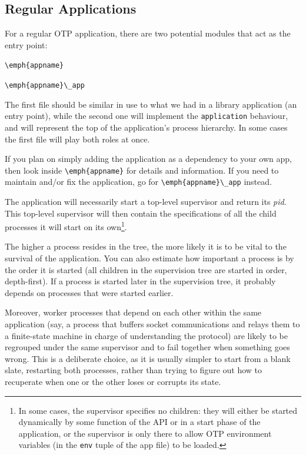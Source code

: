 \documentclass[11pt, oneside]{book}   	%
\newcommand{\module}[1]{\Verb`#1`}
\newcommand{\expression}[1]{\Verb`#1`}
\begin{document}
\subsection{Regular Applications}
\label{subsec:dive-regular-applications}

For a regular OTP application, there are two potential modules that act as the entry point:

\begin{enumerate*}
	\item \module{\emph{appname}}
	\item \module{\emph{appname}\_app}
\end{enumerate*}

The first file should be similar in use to what we had in a library application (an entry point), while the second one will implement the \module{application} behaviour, and will represent the top of the application's process hierarchy. In some cases the first file will play both roles at once.

If you plan on simply adding the application as a dependency to your own app, then look inside \module{\emph{appname}} for details and information. If you need to maintain and/or fix the application, go for \module{\emph{appname}\_app} instead.

The application will necessarily start a top-level supervisor and return its \emph{pid}. This top-level supervisor will then contain the specifications of all the child processes it will start on its own\footnote{In some cases, the supervisor specifies no children: they will either be started dynamically by some function of the API or in a start phase of the application, or the supervisor is only there to allow OTP environment variables (in the \expression{env} tuple of the app file) to be loaded.}.

The higher a process resides in the tree, the more likely it is to be vital to the survival of the application. You can also estimate how important a process is by the order it is started (all children in the supervision tree are started in order, depth-first). If a process is started later in the supervision tree, it probably depends on processes that were started earlier.

Moreover, worker processes that depend on each other within the same application (say, a process that buffers socket communications and relays them to a finite-state machine in charge of understanding the protocol) are likely to be regrouped under the same supervisor and to fail together when something goes wrong. This is a deliberate choice, as it is usually simpler to start from a blank slate, restarting both processes, rather than trying to figure out how to recuperate when one or the other loses or corrupts its state.
\end{document}
